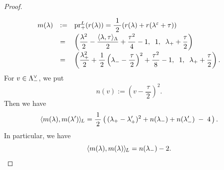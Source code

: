 \documentclass{amsart} %
\begin{document}
\begin{proof}
%
%
\begin{equation}\label{eq:defmlambda}
\renewcommand{\arraystretch}{2}
\begin{array}{lll}
m(\lambda) &:=& \prLplus(\LeechRoot{\lambda})=\dfrac{\;1\;}{2}(\LeechRoot{\lambda}+
\LeechRoot{\lambda^\vep+\tau})\\
&=&
\left(\dfrac{\lambda^2}{2}-\dfrac{\intfLeech{\lambda, \tau}}{2}+\dfrac{\tau^2}{4}-1, 
\;\; 1,\;\; \lambdaplus +\dfrac{\tau}{2}\right)\\
&=&
\left(
\dfrac{\lambdaplus^2}{2}+\dfrac{1}{\,2\,}\left(\lambdaminus-\dfrac{\tau}{\,2\,}\right)^2+\dfrac{\tau^2}{8}-1, 
\;\; 1,\;\; \lambdaplus +\dfrac{\tau}{2}\right).
\end{array}
\end{equation}
%
For $v\in \Lambda_{-}^{\vee}$,
we put
\[
n(v):=\left(v-\dfrac{\,\tau\,}{2}\right)^2.
\]
Then we have
%
\begin{equation}\label{eq:mlmlsprime}
 \langle m(\lambda), m(\lambda^{\prime}) \rangle_{\hskip -1pt L} =\frac{1}{\,2\,}
 \left(\,
({\lambda}_{+} - {\lambda}_{+}^{\prime} )^2
+
n({\lambda}_{-})
+
n({\lambda}_{-}^{\prime})
\;-\;4 
\,\right).
\end{equation}
%
In particular, we have  
%
\[
\langle m(\lambda), m(\lambda) \rangle_{\hskip -1pt L}=n({\lambda}_{-})-2.
\]


\end{proof}
\end{document}
